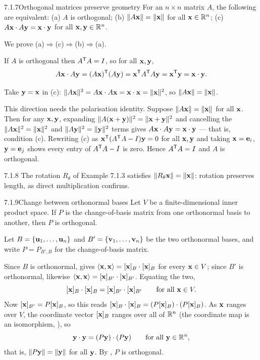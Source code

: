 \begin{thms}{7.1.7}{Orthogonal matrices preserve geometry}
For an $n\times n$ matrix $A$, the following are equivalent:
\textup{(a)} $A$ is orthogonal;
\textup{(b)} $\lVert A\mathbf{x} \rVert=\lVert \mathbf{x} \rVert$ for all $\mathbf{x}\in\mathbb{R}^n$;
\textup{(c)} $A\mathbf{x}\cdot A\mathbf{y}=\mathbf{x}\cdot\mathbf{y}$ for all $\mathbf{x},\mathbf{y}\in\mathbb{R}^n$.
\end{thms}

\begin{prf}
We prove (a)$\Rightarrow$(c)$\Rightarrow$(b)$\Rightarrow$(a).

 If $A$ is orthogonal then $A^{\mathsf{T}} A=I$, so for all $\mathbf{x},\mathbf{y}$,
\[
A\mathbf{x}\cdot A\mathbf{y}=(A\mathbf{x})^{\mathsf{T}}(A\mathbf{y})=\mathbf{x}^{\mathsf{T}} A^{\mathsf{T}} A\mathbf{y}=\mathbf{x}^{\mathsf{T}}\mathbf{y}=\mathbf{x}\cdot\mathbf{y}.
\]

 Take $\mathbf{y}=\mathbf{x}$ in (c): $\lVert A\mathbf{x} \rVert^2=A\mathbf{x}\cdot A\mathbf{x}=\mathbf{x}\cdot\mathbf{x}=\lVert \mathbf{x} \rVert^2$, so $\lVert A\mathbf{x} \rVert=\lVert \mathbf{x} \rVert$.

 This direction needs the polarisation identity. Suppose $\lVert A\mathbf{x} \rVert=\lVert \mathbf{x} \rVert$ for all $\mathbf{x}$. Then for any $\mathbf{x},\mathbf{y}$, expanding $\lVert A(\mathbf{x}+\mathbf{y}) \rVert^2=\lVert \mathbf{x}+\mathbf{y} \rVert^2$ and cancelling the $\lVert A\mathbf{x} \rVert^2=\lVert \mathbf{x} \rVert^2$ and $\lVert A\mathbf{y} \rVert^2=\lVert \mathbf{y} \rVert^2$ terms gives $A\mathbf{x}\cdot A\mathbf{y}=\mathbf{x}\cdot\mathbf{y}$ --- that is, condition (c). Rewriting (c) as $\mathbf{x}^{\mathsf{T}}(A^{\mathsf{T}} A-I)\mathbf{y}=0$ for all $\mathbf{x},\mathbf{y}$ and taking $\mathbf{x}=\mathbf{e}_i$, $\mathbf{y}=\mathbf{e}_j$ shows every entry of $A^{\mathsf{T}} A-I$ is zero. Hence $A^{\mathsf{T}} A=I$ and $A$ is orthogonal.
\end{prf}

\begin{exmp}{7.1.8}{}
The rotation $R_\theta$ of Example 7.1.3 satisfies $\lVert R_\theta\mathbf{x} \rVert=\lVert \mathbf{x} \rVert$: rotation preserves length, as direct multiplication confirms.
\end{exmp}

\begin{thms}{7.1.9}{Change between orthonormal bases}
Let $V$ be a finite-dimensional inner product space. If $P$ is the change-of-basis matrix from one orthonormal basis to another, then $P$ is orthogonal.
\end{thms}

\begin{prf}
Let $B=\{\mathbf{u}_1,\dots,\mathbf{u}_n\}$ and $B'=\{\mathbf{v}_1,\dots,\mathbf{v}_n\}$ be the two orthonormal bases, and write $P=P_{B',B}$ for the change-of-basis matrix.

Since $B$ is orthonormal,  gives $\langle \mathbf{x}, \mathbf{x} \rangle=[\mathbf{x}]_B\cdot[\mathbf{x}]_B$ for every $\mathbf{x}\in V$; since $B'$ is orthonormal, likewise $\langle \mathbf{x}, \mathbf{x} \rangle=[\mathbf{x}]_{B'}\cdot[\mathbf{x}]_{B'}$. Equating the two,
\[
[\mathbf{x}]_B\cdot[\mathbf{x}]_B=[\mathbf{x}]_{B'}\cdot[\mathbf{x}]_{B'}\qquad\text{for all }\mathbf{x}\in V.
\]
Now $[\mathbf{x}]_{B'}=P[\mathbf{x}]_B$, so this reads $[\mathbf{x}]_B\cdot[\mathbf{x}]_B=(P[\mathbf{x}]_B)\cdot(P[\mathbf{x}]_B)$. As $\mathbf{x}$ ranges over $V$, the coordinate vector $[\mathbf{x}]_B$ ranges over all of $\mathbb{R}^n$ (the coordinate map is an isomorphism, ), so
\[
\mathbf{y}\cdot\mathbf{y}=(P\mathbf{y})\cdot(P\mathbf{y})\qquad\text{for all }\mathbf{y}\in\mathbb{R}^n,
\]
that is, $\lVert P\mathbf{y} \rVert=\lVert \mathbf{y} \rVert$ for all $\mathbf{y}$. By , $P$ is orthogonal.
\end{prf}

